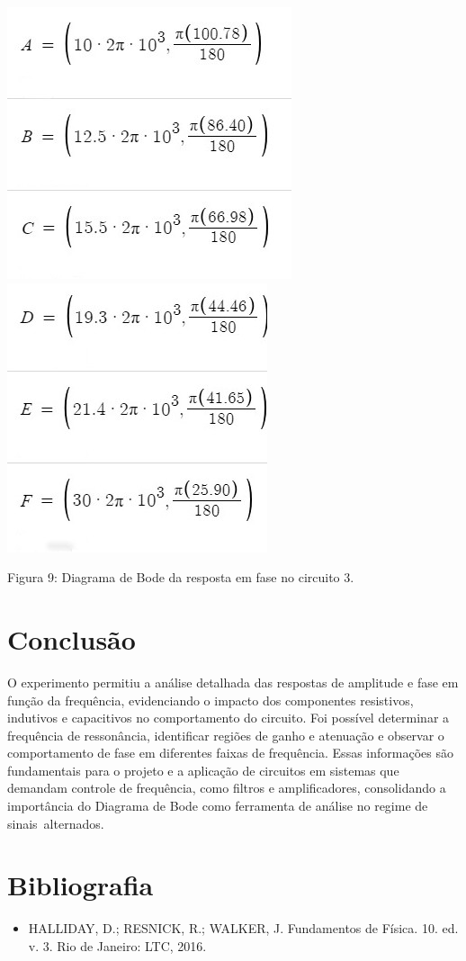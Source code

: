 \documentclass[a4 paper]{article}
\newcommand{\parag}{\hspace{30pt}}
\begin{document}
\begin{table}[h]
\centering
\includegraphics[scale=0.5]{figuras/pontosfase3-1}\includegraphics[scale=0.5]{figuras/pontosfase3}
\end{table}
\begin{center}
Figura 9: Diagrama de Bode da resposta em fase no circuito 3.
\end{center}


\section{Conclusão}
\parag O experimento permitiu a análise detalhada das respostas de amplitude e fase em função da frequência, evidenciando o impacto dos componentes resistivos, indutivos e capacitivos no comportamento do circuito. Foi possível determinar a frequência de ressonância, identificar regiões de ganho e atenuação e observar o comportamento de fase em diferentes faixas de frequência. Essas informações são fundamentais para o projeto e a aplicação de circuitos em sistemas que demandam controle de frequência, como filtros e amplificadores, consolidando a importância do Diagrama de Bode como ferramenta de análise no regime de sinais alternados.


\section{Bibliografia}

\begin{itemize}
\item HALLIDAY, D.; RESNICK, R.; WALKER, J. Fundamentos de Física. 10. ed. v. 3. Rio de Janeiro: LTC, 2016.
\end{itemize}
\end{document}
